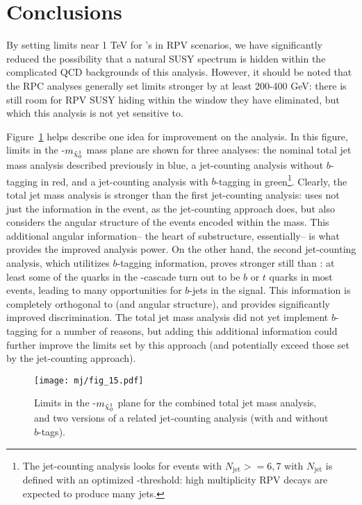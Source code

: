 
\section{Conclusions}

By setting limits near 1 TeV for \gluino's in RPV scenarios, we have significantly reduced the possibility that a natural SUSY spectrum is hidden within the complicated QCD backgrounds of this analysis. However, it should be noted that the RPC analyses generally set limits stronger by at least 200-400 GeV: there is still room for RPV SUSY hiding within the window they have eliminated, but which this analysis is not yet sensitive to.

Figure~\ref{fig:search:limits:compare} helps describe one idea for improvement on the analysis. In this figure, limits in the \mgluino-$m_{\tilde{\chi}_0^1}$ mass plane are shown for three analyses: the nominal total jet mass analysis described previously in blue, a jet-counting analysis without $b$-tagging in red, and a jet-counting analysis with $b$-tagging in green\footnote{The jet-counting analysis looks for events with $N_\mathrm{jet}>=6,7$ with $N_\mathrm{jet}$ is defined with an optimized \pt-threshold: high multiplicity RPV \gluino decays are expected to produce many jets.}. Clearly, the total jet mass analysis is stronger than the first jet-counting analysis: \MJ uses not just the \pt information in the event, as the jet-counting approach does, but also considers the angular structure of the events encoded within the mass. This additional angular information-- the heart of substructure, essentially-- is what provides the improved analysis power. On the other hand, the second jet-counting analysis, which utilitizes $b$-tagging information, proves stronger still than \MJ: at least some of the quarks in the \gluino-\lsp cascade turn out to be $b$ or $t$ quarks in most events, leading to many opportunities for $b$-jets in the signal. This information is completely orthogonal to \pt (and angular structure), and provides significantly improved discrimination. The total jet mass analysis did not yet implement $b$-tagging for a number of reasons, but adding this additional information could further improve the limits set by this approach (and potentially exceed those set by the jet-counting approach).



\begin{figure}
\centering
\texttt{[image: mj/fig\_15.pdf]}
\label{fig:search:limits:compare}
\caption{Limits in the \mgluino-$m_{\tilde{\chi}_0^1}$ plane for the combined total jet mass analysis, and two versions of a related jet-counting analysis (with and without $b$-tags).}
\end{figure}

